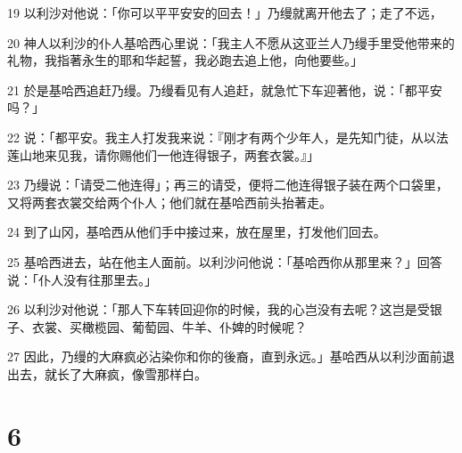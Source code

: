 \par 19 以利沙对他说：「你可以平平安安的回去！」乃缦就离开他去了；走了不远，
\par 20 神人以利沙的仆人基哈西心里说：「我主人不愿从这亚兰人乃缦手里受他带来的礼物，我指著永生的耶和华起誓，我必跑去追上他，向他要些。」
\par 21 於是基哈西追赶乃缦。乃缦看见有人追赶，就急忙下车迎著他，说：「都平安吗？」
\par 22 说：「都平安。我主人打发我来说：『刚才有两个少年人，是先知门徒，从以法莲山地来见我，请你赐他们一他连得银子，两套衣裳。』」
\par 23 乃缦说：「请受二他连得」；再三的请受，便将二他连得银子装在两个口袋里，又将两套衣裳交给两个仆人；他们就在基哈西前头抬著走。
\par 24 到了山冈，基哈西从他们手中接过来，放在屋里，打发他们回去。
\par 25 基哈西进去，站在他主人面前。以利沙问他说：「基哈西你从那里来？」回答说：「仆人没有往那里去。」
\par 26 以利沙对他说：「那人下车转回迎你的时候，我的心岂没有去呢？这岂是受银子、衣裳、买橄榄园、葡萄园、牛羊、仆婢的时候呢？
\par 27 因此，乃缦的大麻疯必沾染你和你的後裔，直到永远。」基哈西从以利沙面前退出去，就长了大麻疯，像雪那样白。

\chapter{6}

